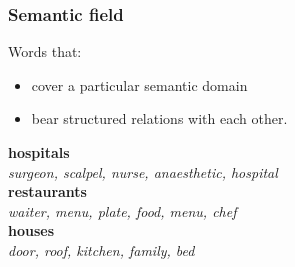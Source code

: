 \documentclass[13.5pt,aspecratio=169, xcolor=dvipsnames]{beamer}
\begin{document}
                \begin{frame}
                    \onehalfspacing
                        \frametitle{Semantic field}
                        {\Large
                        \begin{block}{Words that:}        
                        \begin{itemize}
                            \item cover a particular semantic domain
                            \item bear structured relations with each other.
                        \end{itemize}
                    \end{block}
                        

                        \textbf{hospitals} \\
                        \hspace{1.3em} \textit{surgeon, scalpel, nurse, anaesthetic, hospital} \\
                        \textbf{restaurants} \\
                        \hspace{1.3em} \textit{waiter, menu, plate, food, menu, chef} \\
                        \textbf{houses} \\
                        \hspace{1.3em} \textit{door, roof, kitchen, family, bed}
                        }
                    \end{frame}
\end{document}
